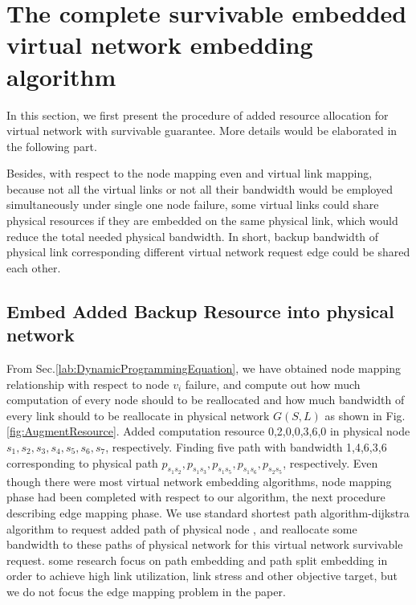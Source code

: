 \section{The complete survivable embedded virtual network embedding algorithm}
In this section, we first present the procedure of added resource allocation  for virtual network with survivable guarantee.
More details would be elaborated in the following part.

Besides, with respect to the node mapping even and virtual link mapping, because not all the virtual links or not all their bandwidth would be employed simultaneously under single one node failure, some virtual links could share physical resources if they are embedded on the same physical link, which would reduce the total needed physical bandwidth. In short, backup bandwidth of physical link corresponding different virtual network request edge could be shared each other.


\subsection{Embed Added Backup Resource into physical network}
From Sec.\ref{lab:DynamicProgrammingEquation}, we have obtained node mapping relationship with respect to node $v_i$ failure, and compute out how much computation of every node should to be reallocated  and how much bandwidth of every link should to be reallocate  in physical network $G(S,L)$ as shown in Fig.\ref{fig:AugmentResource}. Added computation resource 0,2,0,0,3,6,0 in physical node $s_1,s_2,s_3,s_4,s_5,s_6,s_7$, respectively. Finding five path with bandwidth 1,4,6,3,6 corresponding to physical path $p_{s_1s_2},p_{s_1s_3},p_{s_1s_5},p_{s_1s_6},p_{s_2s_5}$, respectively. Even though there were most virtual network embedding algorithms, node mapping phase had been completed with respect to our algorithm, the next procedure describing edge mapping phase. We use standard shortest path algorithm-dijkstra algorithm\cite{skiena1990dijkstra} to request added path of physical node , and reallocate some bandwidth to these paths of physical network for this virtual network survivable request. some research\cite{yu2008rethinking} focus on path embedding and path split embedding in order to achieve high link utilization, link stress and other objective target, but we do not focus the edge mapping problem in the paper.

